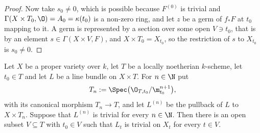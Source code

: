 \begin{proof}
Now take $s_0\neq0$, which is possible because $F^{(0)}$ is trivial and
$\Gamma(X\times T_0,\O)=A_0=\kappa(t_0)$ is a non-zero ring, and let $z$ be a
germ of $f_*F$ at $t_0$ mapping to it.  A germ is represented by a section over
some open $V\ni t_0$, that is by an element $s\in\Gamma(X\times V,F)$, and
$X\times T_0=X_{t_0}$, so the restriction of $s$ to $X_{t_0}$ is $s_0\neq0$.
\end{proof}

\begin{proposition}
\label{prop:cube-formal-triviality}
Let $X$ be a proper variety over $k$, let $T$ be a locally noetherian
$k$-scheme, let $t_0\in T$ and let $L$ be a line bundle on $X\times T$.  For
$n\in\N$ put
\[
  T_n:=\Spec\bigl(\O_{T,t_0}/\m_{t_0}^{n+1}\bigr),
\]
with its canonical morphism $T_n\to T$, and let $L^{(n)}$ be the pullback of
$L$ to $X\times T_n$.  Suppose that $L^{(n)}$ is trivial for every $n\in\N$.
Then there is an open subset $V\subseteq T$ with $t_0\in V$ such that $L_t$ is
trivial on $X_t$ for every $t\in V$.
\end{proposition}
